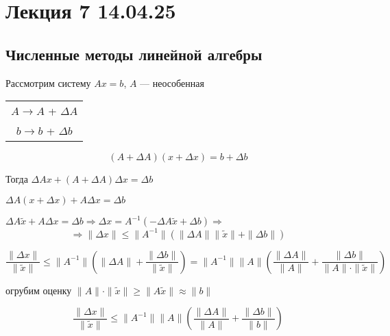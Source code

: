 \def\letus{%
    \mathord{\setbox0=\hbox{$\exists$}%
             \hbox{\kern 0.125\wd0%
                   \vbox to \ht0{%
                      \hrule width 0.75\wd0%
                      \vfill%
                      \hrule width 0.75\wd0}%
                   \vrule height \ht0%
                   \kern 0.125\wd0}%
           }%
}

\section{Лекция 7 14.04.25}
\subsection{Численные методы линейной алгебры}

Рассмотрим систему \( Ax = b \), \( A \) — неособенная

\begin{tabular}{c|}
     \(A \rightarrow A \) + \( \Delta A \)\\
     \(b \rightarrow b \) + \( \Delta b \)
\end{tabular}


\[(A + \Delta A)(x + \Delta x) =b + \Delta b\]

Тогда
\(\Delta A x + (A + \Delta A) \Delta x = \Delta b\)

\leftskip=1.2cm \(\Delta A (x + \Delta x) + A \Delta x = \Delta b\)

\leftskip=1.2cm \(\Delta A \tilde{x} + A \Delta x = \Delta b \Rightarrow \Delta x = A^{-1}(-\Delta A \tilde{x} + \Delta b) \Rightarrow\)
\[\Rightarrow \| \Delta x \| \leq \| A^{-1} \| (\| \Delta A \| \| \tilde{x} \| + \| \Delta b \|)\]

\[\frac{\| \Delta x \|}{\| \tilde{x} \|} \leq \| A^{-1} \| \left(\| \Delta A \| + \frac{\| \Delta b \|}{\| \tilde{x} \|}\right) = \| A^{-1} \| \| A \| \left(\frac{\| \Delta A \|}{\| A \|} + \frac{\| \Delta b \|}{\| A \| \cdot \| \tilde{x} \|}\right)\]

огрубим оценку \(\| A \| \cdot \| \tilde{x} \| \geq \| A \tilde{x} \| \approx \| b \|\)


\[\frac{\| \Delta x \|}{\| \tilde{x} \|} \leq \| A^{-1} \| \| A \| \left(\frac{\| \Delta A \|}{\| A \|} + \frac{\| \Delta b \|}{\| b \|}\right)\]

